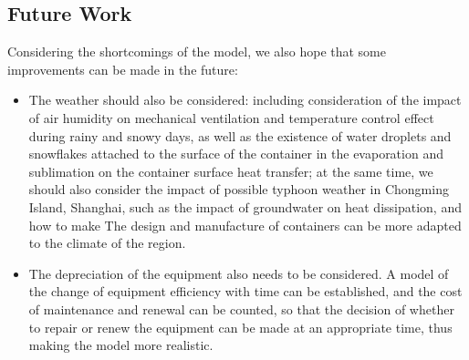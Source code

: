 \subsection{Future Work}
Considering the shortcomings of the model, we also hope that some improvements can be made in the future:
\begin{itemize}
    \item The weather should also be considered: including consideration of the impact of air humidity on mechanical ventilation and temperature control effect during rainy and snowy days, as well as the existence of water droplets and snowflakes attached to the surface of the container in the evaporation and sublimation on the container surface heat transfer; at the same time, we should also consider the impact of possible typhoon weather in Chongming Island, Shanghai, such as the impact of groundwater on heat dissipation, and how to make The design and manufacture of containers can be more adapted to the climate of the region.
    \item The depreciation of the equipment also needs to be considered. A model of the change of equipment efficiency with time can be established, and the cost of maintenance and renewal can be counted, so that the decision of whether to repair or renew the equipment can be made at an appropriate time, thus making the model more realistic.
\end{itemize}
